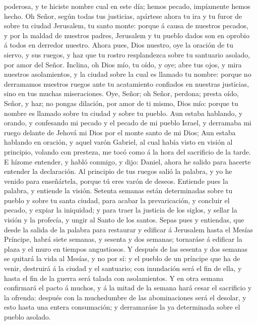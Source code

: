 poderosa, y te hiciste nombre cual en este día; hemos pecado, impíamente
hemos hecho.  Oh Señor, según todas tus justicias, apártese
ahora tu ira y tu furor de sobre tu ciudad Jerusalem, tu santo monte:
porque á causa de nuestros pecados, y por la maldad de nuestros padres,
Jerusalem y tu pueblo dados son en oprobio á todos en derredor nuestro.
 Ahora pues, Dios nuestro, oye la oración de tu siervo, y
sus ruegos, y haz que tu rostro resplandezca sobre tu santuario asolado,
por amor del Señor.  Inclina, oh Dios mío, tu oído, y oye;
abre tus ojos, y mira nuestros asolamientos, y la ciudad sobre la cual
es llamado tu nombre: porque no derramamos nuestros ruegos ante tu
acatamiento confiados en nuestras justicias, sino en tus muchas
miseraciones.  Oye, Señor; oh Señor, perdona; presta oído,
Señor, y haz; no pongas dilación, por amor de ti mismo, Dios mío: porque
tu nombre es llamado sobre tu ciudad y sobre tu pueblo. 
Aun estaba hablando, y orando, y confesando mi pecado y el pecado de mi
pueblo Israel, y derramaba mi ruego delante de Jehová mi Dios por el
monte santo de mi Dios;  Aun estaba hablando en oración, y
aquel varón Gabriel, al cual había visto en visión al principio, volando
con presteza, me tocó como á la hora del sacrificio de la tarde.
 E hízome entender, y habló conmigo, y dijo: Daniel, ahora
he salido para hacerte entender la declaración.  Al
principio de tus ruegos salió la palabra, y yo he venido para
enseñártela, porque tú eres varón de deseos. Entiende pues la palabra, y
entiende la visión.  Setenta semanas están determinadas
sobre tu pueblo y sobre tu santa ciudad, para acabar la prevaricación, y
concluir el pecado, y expiar la iniquidad; y para traer la justicia de
los siglos, y sellar la visión y la profecía, y ungir al Santo de los
santos.  Sepas pues y entiendas, que desde la salida de la
palabra para restaurar y edificar á Jerusalem hasta el Mesías Príncipe,
habrá siete semanas, y sesenta y dos semanas; tornaráse á edificar la
plaza y el muro en tiempos angustiosos.  Y después de las
sesenta y dos semanas se quitará la vida al Mesías, y no por sí: y el
pueblo de un príncipe que ha de venir, destruirá á la ciudad y el
santuario; con inundación será el fin de ella, y hasta el fin de la
guerra será talada con asolamientos.  Y en otra semana
confirmará el pacto á muchos, y á la mitad de la semana hará cesar el
sacrificio y la ofrenda: después con la muchedumbre de las abominaciones
será el desolar, y esto hasta una entera consumación; y derramaráse la
ya determinada sobre el pueblo asolado.

